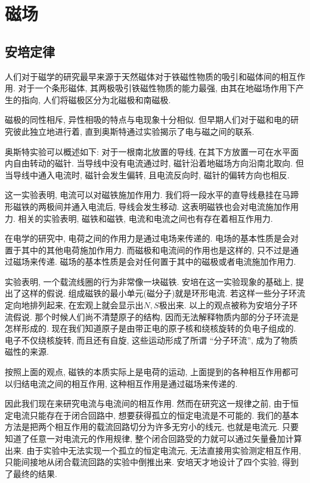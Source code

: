\chapter{磁场}
\section{安培定律}

人们对于磁学的研究最早来源于天然磁体对于铁磁性物质的吸引和磁体间的相互作用. 对于一个条形磁体, 其两极吸引铁磁性物质的能力最强, 由其在地磁场作用下产生的指向, 人们将磁极区分为北磁极和南磁极.

磁极的同性相斥, 异性相吸的特点与电现象十分相似. 但早期人们对于磁和电的研究彼此独立地进行着, 直到奥斯特通过实验揭示了电与磁之间的联系.

奥斯特实验可以概述如下: 对于一根南北放置的导线, 在其下方放置一可在水平面内自由转动的磁针. 当导线中没有电流通过时, 磁针沿着地磁场方向沿南北取向. 但当导线中通入电流时, 磁针会发生偏转, 且电流反向时, 磁针的偏转方向也相反.

这一实验表明, 电流可以对磁铁施加作用力. 我们将一段水平的直导线悬挂在马蹄形磁铁的两极间并通入电流后, 导线会发生移动. 这表明磁铁也会对电流施加作用力. 相关的实验表明, 磁铁和磁铁, 电流和电流之间也有存在着相互作用力.

在电学的研究中, 电荷之间的作用力是通过电场来传递的. 电场的基本性质是会对置于其中的其他电荷施加作用力. 而磁极和电流间的作用也是这样的, 只不过是通过磁场来传递. 磁场的基本性质是会对任何置于其中的磁极或者电流施加作用力.

实验表明, 一个载流线圈的行为非常像一块磁铁. 安培在这一实验现象的基础上, 提出了这样的假说. 组成磁铁的最小单元(磁分子)就是环形电流. 若这样一些分子环流定向地排列起来, 在宏观上就会显示出$N,S$极出来. 以上的观点被称为安培分子环流假说. 那个时候人们尚不清楚原子的结构, 因而无法解释物质内部的分子环流是怎样形成的. 现在我们知道原子是由带正电的原子核和绕核旋转的负电子组成的. 电子不仅绕核旋转, 而且还有自旋, 这些运动形成了所谓 ``分子环流'', 成为了物质磁性的来源.

按照上面的观点, 磁铁的本质实际上是电荷的运动, 上面提到的各种相互作用都可以归结电流之间的相互作用, 这种相互作用是通过磁场来传递的.

因此我们现在来研究电流与电流间的相互作用. 然而在研究这一规律之前, 由于恒定电流只能存在于闭合回路中, 想要获得孤立的恒定电流是不可能的. 我们的基本方法是把两个相互作用的载流回路切分为许多无穷小的线元, 也就是电流元. 只要知道了任意一对电流元的作用规律, 整个闭合回路受的力就可以通过矢量叠加计算出来. 由于实验中无法实现一个孤立的恒定电流元, 无法直接用实验测定相互作用, 只能间接地从闭合载流回路的实验中倒推出来. 安培天才地设计了四个实验, 得到了最终的结果.

